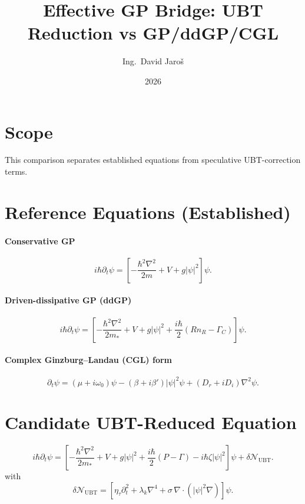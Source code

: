 \documentclass[11pt,a4paper]{article}
\title{Effective GP Bridge: UBT Reduction vs GP/ddGP/CGL}
\author{Ing.\ David Jaroš}
\date{2026}
\begin{document}
\maketitle

\section*{Scope}
This comparison separates established equations from speculative UBT-correction terms.

\section{Reference Equations (Established)}
\paragraph{Conservative GP}
\begin{equation}
i\hbar\partial_t\psi=\left[-\frac{\hbar^2\nabla^2}{2m}+V+g|\psi|^2\right]\psi.
\end{equation}

\paragraph{Driven-dissipative GP (ddGP)}
\begin{equation}
i\hbar\partial_t\psi=\left[-\frac{\hbar^2\nabla^2}{2m_*}+V+g|\psi|^2+\frac{i\hbar}{2}(R n_R-\Gamma_C)\right]\psi.
\end{equation}

\paragraph{Complex Ginzburg--Landau (CGL) form}
\begin{equation}
\partial_t\psi=(\mu+i\omega_0)\psi-(\beta+i\beta')|\psi|^2\psi+(D_r+iD_i)\nabla^2\psi.
\end{equation}

\section{Candidate UBT-Reduced Equation}
\begin{equation}
i\hbar\partial_t\psi=\left[-\frac{\hbar^2\nabla^2}{2m_*}+V+g|\psi|^2+\frac{i\hbar}{2}(P-\Gamma)-i\hbar\zeta|\psi|^2\right]\psi+\delta\mathcal N_{\mathrm{UBT}}.
\end{equation}
with
\begin{equation}
\delta\mathcal N_{\mathrm{UBT}}=\left[\eta_\tau\partial_t^2+\lambda_k\nabla^4+\sigma\,\nabla\cdot(|\psi|^2\nabla)\right]\psi.
\end{equation}
\end{document}
